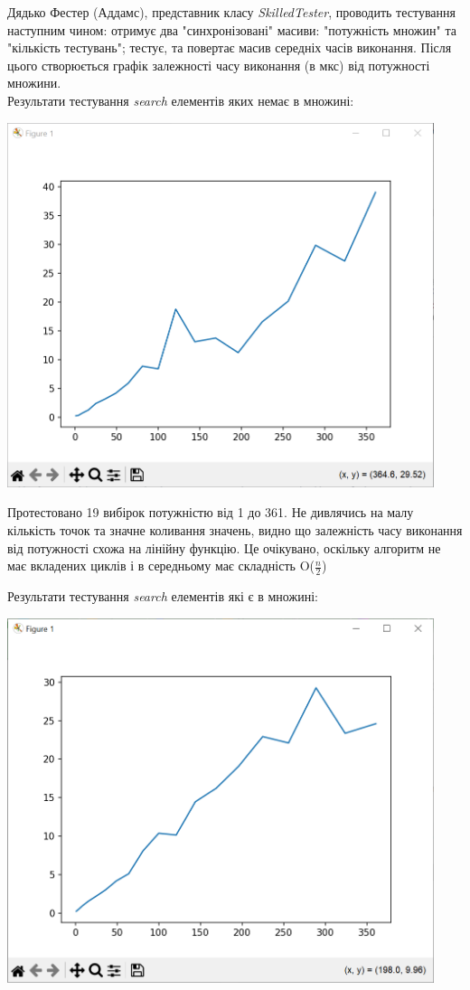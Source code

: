 \documentclass{article}
\begin{document}
Дядько Фестер (Аддамс), представник класу \textit{SkilledTester}, проводить тестування наступним чином: отримує два "синхронізовані" масиви: "потужність множин" та "кількість тестувань"; тестує, та повертає масив середніх часів виконання. Після цього створюється графік залежності часу виконання (в мкс) від потужності множини.\\\indent
Результати тестування \textit{search} елементів яких немає в множині:
\begin{center}
    \includegraphics[width=125mm]{search}
\end{center}

Протестовано 19 вибірок потужністю від 1 до 361. Не дивлячись на малу кількість точок та значне коливання значень, видно що залежність часу виконання від потужності схожа на лінійну функцію. Це очікувано, оскільку алгоритм не має вкладених циклів і в середньому має складність O($\frac{n}{2}$)\\\indent

Результати тестування \textit{search} елементів які є в множині:\\\indent

\begin{center}
    \includegraphics[width=125mm]{search_for_element}
\end{center}
\end{document}
